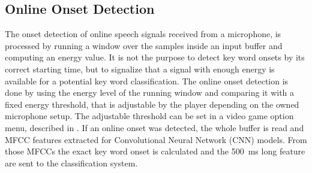 
\subsection{Online Onset Detection}
The onset detection of online speech signals received from a microphone, is processed by running a window over the samples inside an input buffer and computing an energy value.
It is not the purpose to detect key word onsets by its correct starting time, but to signalize that a signal with enough energy is available for a potential key word classification.
The online onset detection is done by using the energy level of the running window and comparing it with a fixed energy threshold, that is adjustable by the player depending on the owned microphone setup.
The adjustable threshold can be set in a video game option menu, described in .
If an online onset was detected, the whole buffer is read and MFCC features extracted for Convolutional Neural Network (CNN) models.
From those MFCCs the exact key word onset is calculated and the \SI{500}{\milli\second} long feature are sent to the classification system.
